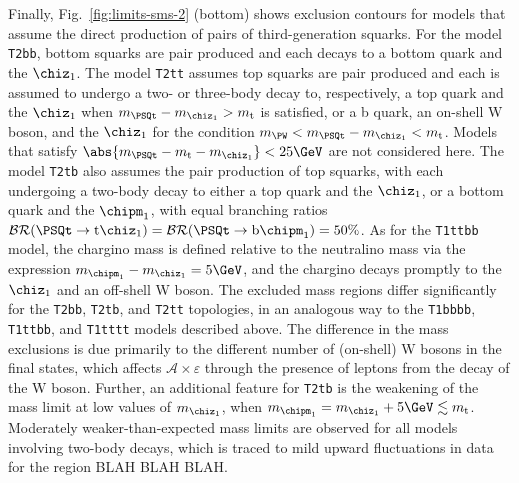 Finally, Fig.~\ref{fig:limits-sms-2} (bottom) shows exclusion contours
for models that assume the direct production of pairs of
third-generation squarks. For the model \texttt{T2bb}, bottom squarks
are pair produced and each decays to a bottom quark and the
$\chiz_1$. The model \texttt{T2tt} assumes top squarks are pair
produced and each is assumed to undergo a two- or three-body decay to,
respectively, a top quark and the $\chiz_1$ when $m_{\PSQt} -
m_{\chiz_1} > m_\text{t}$ is satisfied, or a b quark, an on-shell W
boson, and the $\chiz_1$ for the condition $m_{\PW} < m_{\PSQt} -
m_{\chiz_1} < m_\text{t}$. Models that satisfy $\abs{m_{\PSQt} -
  m_\text{t} - m_{\chiz_1}} < 25\GeV$ are not considered here. The
model \texttt{T2tb} also assumes the pair production of top squarks,
with each undergoing a two-body decay to either a top quark and the
$\chiz_1$, or a bottom quark and the $\chipm_1$, with equal branching
ratios $\mathcal{BR}(\PSQt \ra \text{t}\chiz_1) = \mathcal{BR}(\PSQt
\ra \text{b}\chipm_1) = 50\%$. As for the \texttt{T1ttbb} model, the
chargino mass is defined relative to the neutralino mass via the
expression $m_{\chipm_1} - m_{\chiz_1} = 5\GeV$, and the chargino
decays promptly to the $\chiz_1$ and an off-shell W boson. The
excluded mass regions differ significantly for the \texttt{T2bb},
\texttt{T2tb}, and \texttt{T2tt} topologies, in an analogous way to
the \texttt{T1bbbb}, \texttt{T1ttbb}, and \texttt{T1tttt} models
described above. The difference in the mass exclusions is due
primarily to the different number of (on-shell) W bosons in the final
states, which affects $\mathcal{A} \times \varepsilon$ through the
presence of leptons from the decay of the W boson. Further, an
additional feature for \texttt{T2tb} is the weakening of the mass
limit at low values of $m_{\chiz_1}$, when $m_{\chipm_1} = m_{\chiz_1}
+ 5\GeV \lesssim m_\text{t}$. Moderately weaker-than-expected mass
limits are observed for all models involving two-body decays, which is
traced to mild upward fluctuations in data for the region BLAH BLAH
BLAH.

